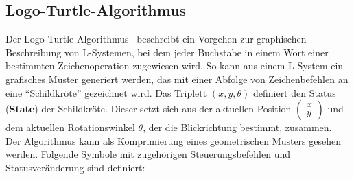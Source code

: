 \subsection*{Logo-Turtle-Algorithmus}
Der Logo-Turtle-Algorithmus~\cite{prusinkiewicz_1986} beschreibt ein Vorgehen zur graphischen Beschreibung von L-Systemen, bei dem
jeder Buchstabe in einem Wort einer bestimmten Zeichenoperation zugewiesen wird.
So kann aus einem L-System ein grafisches Muster generiert werden, das mit einer Abfolge von Zeichenbefehlen an
eine "`Schildkröte"' gezeichnet wird.
Das Triplett $(x,y,\theta)$ definiert den Status (\textbf{State}) der Schildkröte.
Dieser setzt sich aus der aktuellen Position $\left(\begin{smallmatrix} x \\ y \end{smallmatrix}\right)$ und dem
aktuellen Rotationswinkel $\theta$, der die Blickrichtung bestimmt, zusammen.\\
Der Algorithmus kann als Komprimierung eines geometrischen Musters gesehen werden.
Folgende Symbole mit zugehörigen Steuerungsbefehlen und Statusveränderung sind definiert:
